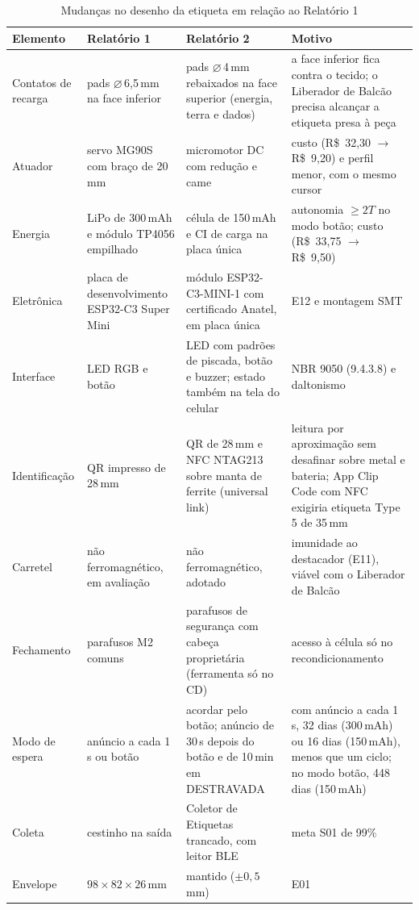 \begin{table}[htbp]
    \centering
    \caption{Mudanças no desenho da etiqueta em relação ao Relatório 1}
    \label{tab:r2-mudancas}
    \scriptsize
    \renewcommand{\arraystretch}{1.25}
    \begin{tabularx}{\textwidth}{@{}
        >{\RaggedRight\arraybackslash}p{1.9cm}
        >{\RaggedRight\arraybackslash}X
        >{\RaggedRight\arraybackslash}X
        >{\RaggedRight\arraybackslash}X@{}}
        \toprule
        \textbf{Elemento} & \textbf{Relatório 1} & \textbf{Relatório 2} & \textbf{Motivo} \\
        \midrule
        Contatos de recarga & 2 pads $\varnothing$\,6,5\,mm na face inferior & 3 pads $\varnothing$\,4\,mm rebaixados na face superior (energia, terra e dados) & a face inferior fica contra o tecido; o Liberador de Balcão precisa alcançar a etiqueta presa à peça \\
        Atuador & servo MG90S com braço de 20\,mm & micromotor DC com redução e came & custo (R\$~32,30 $\rightarrow$ R\$~9,20) e perfil menor, com o mesmo cursor \\
        Energia & LiPo de 300\,mAh e módulo TP4056 empilhado & célula de 150\,mAh e CI de carga na placa única & autonomia $\geq 2T$ no modo botão; custo (R\$~33,75 $\rightarrow$ R\$~9,50) \\
        Eletrônica & placa de desenvolvimento ESP32-C3 Super Mini & módulo ESP32-C3-MINI-1 com certificado Anatel, em placa única & E12 e montagem SMT \\
        Interface & LED RGB e botão & LED com padrões de piscada, botão e buzzer; estado também na tela do celular & NBR 9050 (9.4.3.8) e daltonismo \\
        Identificação & QR impresso de 28\,mm & QR de 28\,mm e NFC NTAG213 sobre manta de ferrite (universal link) & leitura por aproximação sem desafinar sobre metal e bateria; App Clip Code com NFC exigiria etiqueta Type 5 de 35\,mm \\
        Carretel & não ferromagnético, em avaliação & não ferromagnético, adotado & imunidade ao destacador (E11), viável com o Liberador de Balcão \\
        Fechamento & 4 parafusos M2 comuns & parafusos de segurança com cabeça proprietária (ferramenta só no CD) & acesso à célula só no recondicionamento \\
        Modo de espera & anúncio a cada 1\,s ou botão & acordar pelo botão; anúncio de 30\,s depois do botão e de 10\,min em DESTRAVADA & com anúncio a cada 1\,s, 32 dias (300\,mAh) ou 16 dias (150\,mAh), menos que um ciclo; no modo botão, 448 dias (150\,mAh) \\
        Coleta & cestinho na saída & Coletor de Etiquetas trancado, com leitor BLE & meta S01 de 99\% \\
        Envelope & $98 \times 82 \times 26$\,mm & mantido ($\pm 0{,}5$\,mm) & E01 \\
        \bottomrule
    \end{tabularx}
\end{table}

